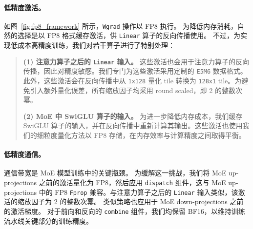 \paragraph{低精度激活。}
如图~\ref{fig:fp8_framework} 所示，\texttt{Wgrad} 操作以 FP8 执行。
为降低内存消耗，自然的选择是以 FP8 格式缓存激活，供 \texttt{Linear} 算子的反向传播使用。
不过，为实现低成本高精度训练，我们对若干算子进行了特别处理：
\begin{quote}
\textbf{(1) 注意力算子之后的 \texttt{Linear} 输入。} 这些激活也会用于注意力算子的反向传播，因此对精度敏感。我们专门为这些激活采用定制的 \texttt{E5M6} 数据格式。此外，这些激活会在反向传播中从 \texttt{1x128} 量化 tile 转换为 \texttt{128x1} tile。为避免引入额外量化误差，所有缩放因子均采用 round scaled，即 2 的整数次幂。

\textbf{(2) MoE 中 SwiGLU 算子的输入。} 为进一步降低内存成本，我们缓存 SwiGLU 算子的输入，并在反向传播中重新计算其输出。这些激活也使用我们的细粒度量化方法以 FP8 存储，在内存效率与计算精度之间取得平衡。
\end{quote}

\paragraph{低精度通信。}
通信带宽是 MoE 模型训练中的关键瓶颈。
为缓解这一挑战，我们将 MoE up-projections 之前的激活量化为 FP8，然后应用 \texttt{dispatch} 组件，这与 MoE up-projections 中的 FP8 \texttt{Fprop} 兼容。与注意力算子之后的 \texttt{Linear} 输入类似，该激活的缩放因子为 2 的整数次幂。
类似策略也应用于 MoE down-projections 之前的激活梯度。
对于前向和反向的 \texttt{combine} 组件，我们均保留 BF16，以维持训练流水线关键部分的训练精度。
